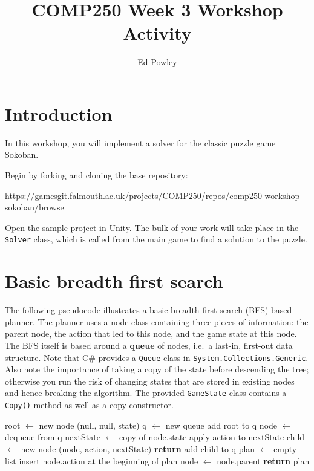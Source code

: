 \documentclass{../../../bsc-assignment-briefs/fal_assignment}
\title{COMP250 Week 3 Workshop Activity}
\author{Ed Powley}
\begin{document}
\maketitle

\section*{Introduction}

In this workshop, you will implement a solver for the classic puzzle game Sokoban.

Begin by forking and cloning the base repository:

https://gamesgit.falmouth.ac.uk/projects/COMP250/repos/comp250-workshop-sokoban/browse

Open the sample project in Unity. The bulk of your work will take place in the \texttt{Solver} class, which is called from the main game to find a solution to the puzzle.

\section*{Basic breadth first search}

The following pseudocode illustrates a basic breadth first search (BFS) based planner.
The planner uses a node class containing three pieces of information:
the parent node,
the action that led to this node,
and the game state at this node.
The BFS itself is based around a \textbf{queue} of nodes,
i.e.\ a last-in, first-out data structure.
Note that C\# provides a \lstinline{Queue} class in \lstinline{System.Collections.Generic}.
Also note the importance of taking a copy of the state before descending the tree;
otherwise you run the risk of changing states that are stored in existing nodes and hence breaking the algorithm.
The provided \lstinline{GameState} class contains a \lstinline{Copy()} method as well as a copy constructor.

\begin{algorithmic}
        \State root $\gets$ new node (null, null, state)
        \State q $\gets$ new queue
        \State add root to q
            \State node $\gets$ dequeue from q
                \State nextState $\gets$ copy of node.state
                \State apply action to nextState
                \State child $\gets$ new node (node, action, nextState)
                    \State \textbf{return} 
                \Else
                    \State add child to q
                \EndIf
            \EndFor
        \EndWhile
    \EndProcedure
        \State plan $\gets$ empty list
            \State insert node.action at the beginning of plan
            \State node $\gets$ node.parent
        \EndWhile
        \State \textbf{return} plan
    \EndProcedure
\end{algorithmic}
\end{document}
